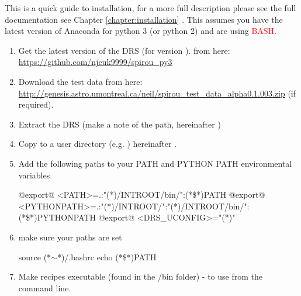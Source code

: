 \noindent This is a quick guide to installation, for a more full description please \ifquickguide see the full documentation \else see Chapter \ref{chapter:installation} \fi. This assumes you have the latest version of Anaconda for python 3 (or python 2) and are using \textcolor{red}{BASH}.


\begin{enumerate}

\item Get the latest version of the DRS (for \instrument version \MyCodeVersion). from here: \url{https://github.com/njcuk9999/spirou_py3}

\item Download the test data from here: \url{http://genesis.astro.umontreal.ca/neil/spirou_test_data_alpha0.1.003.zip} (if required).

\item Extract the DRS (make a note of the path, hereinafter \InstallDIR)

\item Copy \InstallDIR{} to a user directory (e.g. ) hereinafter \userDIR.

\item Add the following paths to your PATH and PYTHON PATH environmental variables

	\begin{bashbox}[title={e.g. in $\sim$/.bashrc or $\sim$/.bash\_profile}]
	@export@ <PATH>=.:"(*\InstallDIR*)/INTROOT/bin/":{(*\$*)PATH}
	@export@ <PYTHONPATH>=.:"(*\InstallDIR*)/INTROOT/":"(*\InstallDIR*)/INTROOT/bin/":{(*\$*)PYTHONPATH}
	@export@ <DRS_UCONFIG>="(*\userDIR*)"
	\end{bashbox}

\item make sure your paths are set
	\begin{cmdbox}
	source (*$\sim$*)/.bashrc
	echo (*\$*)PATH
	\end{cmdbox}

\item Make recipes executable (found in the \InstallDIR/bin folder) - to use from the command line.


\end{enumerate}
